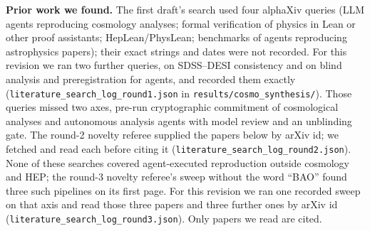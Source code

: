 \documentclass[11pt]{article}
\begin{document}
\textbf{Prior work we found.} The first draft's search used four alphaXiv queries (LLM agents reproducing cosmology analyses; formal verification of
physics in Lean or other proof assistants; HepLean/PhysLean; benchmarks of agents reproducing astrophysics papers); their exact strings and dates
were not recorded. For this revision we ran two further queries, on SDSS--DESI consistency and on blind analysis and preregistration for agents,
and recorded them exactly (\texttt{literature\_search\_log\_round1.json} in \texttt{results/cosmo\_synthesis/}). Those queries missed two axes, pre-run cryptographic
commitment of cosmological analyses and autonomous analysis agents with model review and an unblinding gate. The round-2 novelty referee supplied the papers below
by arXiv id; we fetched and read each before citing it (\texttt{literature\_search\_log\_round2.json}). None of these searches covered agent-executed reproduction
outside cosmology and HEP; the round-3 novelty referee's sweep without the word ``BAO'' found three such pipelines on its first page. For this revision we ran one
recorded sweep on that axis and read those three papers and three further ones by arXiv id (\texttt{literature\_search\_log\_round3.json}). Only papers we read are cited.
\end{document}
